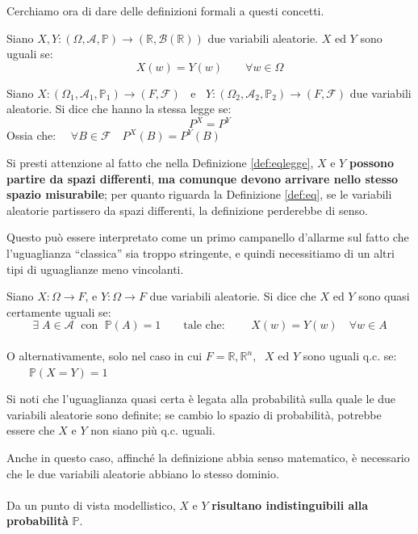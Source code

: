 \bigskip
\noindent Cerchiamo ora di dare delle definizioni formali a questi concetti.
\begin{definizione}
\label{def:eq}
    Siano $X, Y:(\Omega, \mathcal{A}, \mathbb{P})\to(\mathbb{R}, \mathcal{B}(\mathbb{R}))$ due variabili aleatorie. $X$ ed $Y$ sono uguali se:
    \[X(w) = Y(w)\qquad \forall w\in\Omega\]
\end{definizione}

\begin{definizione}
\label{def:eqlegge}
    Siano $X:(\Omega_1, \mathcal{A}_1, \mathbb{P}_1)\to (F, \mathcal{F})\;\;$ e $\;\;Y:(\Omega_2, \mathcal{A}_2, \mathbb{P}_2)\to (F, \mathcal{F})$ due variabili aleatorie. Si dice che hanno la stessa legge se:
    \[P^X=P^Y\]
    Ossia che: $\quad \forall B\in\mathcal{F}\quad P^X(B)=P^Y(B)$
\end{definizione}

Si presti attenzione al fatto che nella Definizione \ref{def:eqlegge}, $X$ e $Y$ \textbf{possono partire da spazi differenti}, \textbf{ma comunque devono arrivare nello stesso spazio misurabile}; per quanto riguarda la Definizione \ref{def:eq}, se le variabili aleatorie partissero da spazi differenti, la definizione perderebbe di senso.

\medskip
\noindent Questo può essere interpretato come un primo campanello d'allarme sul fatto che l'uguaglianza ``classica'' sia troppo stringente, e quindi necessitiamo di un altri tipi di uguaglianze meno vincolanti.
\begin{definizione}
Siano $X:\Omega\to F$, e $Y:\Omega \to F$ due variabili aleatorie. Si dice che $X$ ed $Y$ sono quasi certamente uguali se:
\[\exists \;A\in\mathcal{A} \;\text{ con }\;\mathbb{P}(A) = 1\qquad \text{tale che: }\qquad X(w) = Y(w)\quad \forall w\in A\]
\\
O alternativamente, solo nel caso in cui  $F=\mathbb{R}, \mathbb{R}^n, \;$ $X$ ed $Y$ sono uguali q.c. se:\(\qquad \mathbb{P}(X=Y) = 1\)
\end{definizione}

Si noti che l'uguaglianza quasi certa è legata alla probabilità sulla quale le due variabili aleatorie sono definite; se cambio lo spazio di probabilità, potrebbe essere che $X$ e $Y$ non siano più q.c. uguali.

\medskip
\noindent Anche in questo caso, affinché la definizione abbia senso matematico, è necessario che le due variabili aleatorie abbiano lo stesso dominio.\\
\\
Da un punto di vista modellistico, $X$ e $Y$ \textbf{risultano indistinguibili alla probabilità} $\mathbb{P}$.

